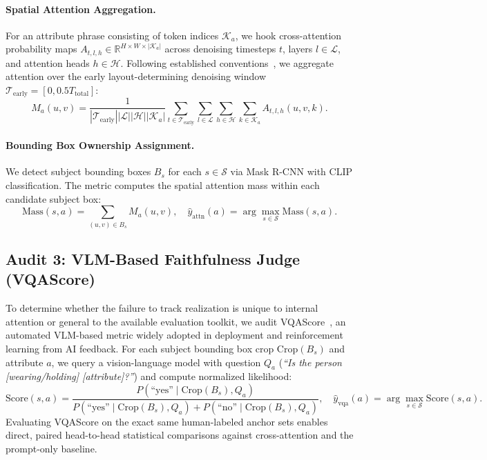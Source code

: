 \paragraph{Spatial Attention Aggregation.} For an attribute phrase consisting of token indices $\mathcal{K}_a$, we hook cross-attention probability maps $A_{t,l,h} \in \mathbb{R}^{H \times W \times |\mathcal{K}_a|}$ across denoising timesteps $t$, layers $l \in \mathcal{L}$, and attention heads $h \in \mathcal{H}$. Following established conventions~\citep{chefer2023attendandexcite}, we aggregate attention over the early layout-determining denoising window $\mathcal{T}_{\text{early}} = [0, 0.5 T_{\text{total}}]$:
\begin{equation}
M_a(u, v) = \frac{1}{|\mathcal{T}_{\text{early}}| |\mathcal{L}| |\mathcal{H}| |\mathcal{K}_a|} \sum_{t \in \mathcal{T}_{\text{early}}} \sum_{l \in \mathcal{L}} \sum_{h \in \mathcal{H}} \sum_{k \in \mathcal{K}_a} A_{t,l,h}(u, v, k).
\end{equation}

\paragraph{Bounding Box Ownership Assignment.} We detect subject bounding boxes $B_s$ for each $s \in \mathcal{S}$ via Mask R-CNN with CLIP classification. The metric computes the spatial attention mass within each candidate subject box:
\begin{equation}
\text{Mass}(s, a) = \sum_{(u, v) \in B_s} M_a(u, v), \quad \hat{y}_{\text{attn}}(a) = \arg\max_{s \in \mathcal{S}} \text{Mass}(s, a).
\end{equation}

\subsection{Audit 3: VLM-Based Faithfulness Judge (VQAScore)}
\label{sec:method_vqascore}
To determine whether the failure to track realization is unique to internal attention or general to the available evaluation toolkit, we audit VQAScore~\citep{lin2024vqascore}, an automated VLM-based metric widely adopted in deployment and reinforcement learning from AI feedback. For each subject bounding box crop $\text{Crop}(B_s)$ and attribute $a$, we query a vision-language model with question $Q_a$ (\emph{``Is the person [wearing/holding] [attribute]?''}) and compute normalized likelihood:
\begin{equation}
\text{Score}(s, a) = \frac{P(\text{``yes''} \mid \text{Crop}(B_s), Q_a)}{P(\text{``yes''} \mid \text{Crop}(B_s), Q_a) + P(\text{``no''} \mid \text{Crop}(B_s), Q_a)}, \quad \hat{y}_{\text{vqa}}(a) = \arg\max_{s \in \mathcal{S}} \text{Score}(s, a).
\end{equation}
Evaluating VQAScore on the exact same human-labeled anchor sets enables direct, paired head-to-head statistical comparisons against cross-attention and the prompt-only baseline.

